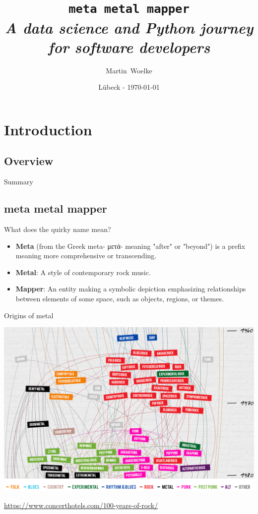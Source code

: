 \documentclass{beamer}
\title[Titel]
{
  \texttt{\huge{meta metal mapper}}\\\vspace{3 mm}
  \textit{A data science and Python journey for software developers}
}
\author[Martin Woelke]
{
  Martin~Woelke
}
\date{Lübeck - \today}
\begin{document}
\begin{frame}
  \titlepage
\end{frame}


\section{Introduction}


  \subsection{Overview}

    \begin{frame}{Summary}
      \tableofcontents
    \end{frame}

  \subsection{meta metal mapper}

    \begin{frame}{What does the quirky name mean?}
      \begin{itemize}
        \item<1->\textbf{Meta} (from the Greek meta- \foreignlanguage{greek}{μετά}- meaning
        "after" or "beyond") is a prefix meaning more comprehensive or transcending.
        \item<2->\textbf{Metal}: A style of contemporary rock  music.
        \item<3->\textbf{Mapper}: An entity making a symbolic depiction emphasizing relationships
        between elements of some space, such as objects, regions, or themes.
      \end{itemize}
    \end{frame}

    \begin{frame}{Origins of metal}
      \begin{center}
        \includegraphics[scale=.33]{familyTree2}
      \end{center}
      \href{https://www.concerthotels.com/100-years-of-rock/}{https://www.concerthotels.com/100-years-of-rock/}
    \end{frame}
\end{document}
